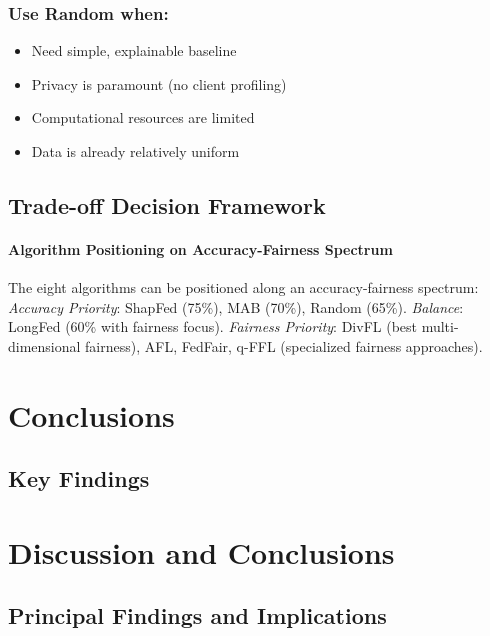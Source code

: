 \documentclass{article}
\begin{document}
\subsubsection{Use Random when:}
\begin{itemize}
    \item Need simple, explainable baseline
    \item Privacy is paramount (no client profiling)
    \item Computational resources are limited
    \item Data is already relatively uniform
\end{itemize}

\subsection{Trade-off Decision Framework}

\paragraph{Algorithm Positioning on Accuracy-Fairness Spectrum}
The eight algorithms can be positioned along an accuracy-fairness spectrum: \textit{Accuracy Priority}: ShapFed (75\%), MAB (70\%), Random (65\%). \textit{Balance}: LongFed (60\% with fairness focus). \textit{Fairness Priority}: DivFL (best multi-dimensional fairness), AFL, FedFair, q-FFL (specialized fairness approaches).

\section{Conclusions}

\subsection{Key Findings}

\section{Discussion and Conclusions}

\subsection{Principal Findings and Implications}
\end{document}
